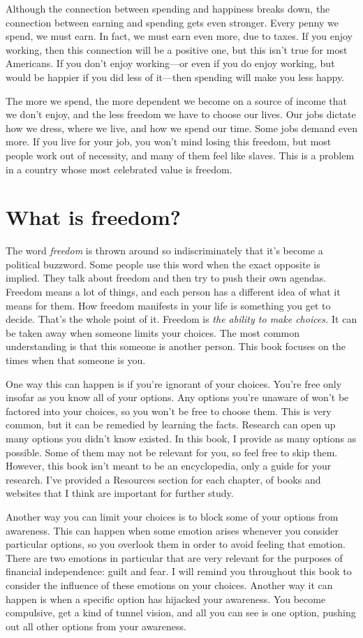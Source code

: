 Although the connection between spending and happiness breaks down, the connection between earning and spending gets even stronger. Every penny we spend, we must earn. In fact, we must earn even more, due to taxes. If you enjoy working, then this connection will be a positive one, but this isn't true for most Americans. If you don't enjoy working---or even if you do enjoy working, but would be happier if you did less of it---then spending will make you less happy.

The more we spend, the more dependent we become on a source of income that we don't enjoy, and the less freedom we have to choose our lives. Our jobs dictate how we dress, where we live, and how we spend our time. Some jobs demand even more. If you live for your job, you won't mind losing this freedom, but most people work out of necessity, and many of them feel like slaves. This is a problem in a country whose most celebrated value is freedom.

\section{What is freedom?}
The word \emph{freedom} is thrown around so indiscriminately that it's become a political buzzword. Some people use this word when the exact opposite is implied. They talk about freedom and then try to push their own agendas. Freedom means a lot of things, and each person has a different idea of what it means for them. How freedom manifests in your life is something you get to decide. That's the whole point of it. Freedom is \emph{the ability to make choices.} It can be taken away when someone limits your choices. The most common understanding is that this someone is another person. This book focuses on the times when that someone is you.

One way this can happen is if you're ignorant of your choices. You're free only insofar as you know all of your options. Any options you're unaware of won't be factored into your choices, so you won't be free to choose them. This is very common, but it can be remedied by learning the facts. Research can open up many options you didn't know existed. In this book, I provide as many options as possible. Some of them may not be relevant for you, so feel free to skip them. However, this book isn't meant to be an encyclopedia, only a guide for your research. I've provided a Resources section for each chapter, of books and websites that I think are important for further study.

Another way you can limit your choices is to block some of your options from awareness. This can happen when some emotion arises whenever you consider particular options, so you overlook them in order to avoid feeling that emotion. There are two emotions in particular that are very relevant for the purposes of financial independence: guilt and fear. I will remind you throughout this book to consider the influence of these emotions on your choices. Another way it can happen is when a specific option has hijacked your awareness. You become compulsive, get a kind of tunnel vision, and all you can see is one option, pushing out all other options from your awareness.


